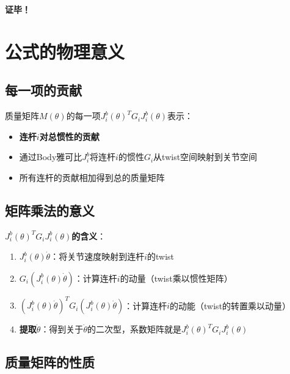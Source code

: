 \documentclass[12pt,a4paper]{article}
\begin{document}
\textbf{证毕！}

\section{公式的物理意义}

\subsection{每一项的贡献}

质量矩阵$M(\theta)$的每一项$J_i^b(\theta)^T G_i J_i^b(\theta)$表示：

\begin{itemize}
\item \textbf{连杆$i$对总惯性的贡献}
\item 通过Body雅可比$J_i^b$将连杆$i$的惯性$G_i$从twist空间映射到关节空间
\item 所有连杆的贡献相加得到总的质量矩阵
\end{itemize}

\subsection{矩阵乘法的意义}

\textbf{$J_i^b(\theta)^T G_i J_i^b(\theta)$的含义}：

\begin{enumerate}
\item \textbf{$J_i^b(\theta) \dot{\theta}$}：将关节速度映射到连杆$i$的twist
\item \textbf{$G_i (J_i^b(\theta) \dot{\theta})$}：计算连杆$i$的动量（twist乘以惯性矩阵）
\item \textbf{$(J_i^b(\theta) \dot{\theta})^T G_i (J_i^b(\theta) \dot{\theta})$}：计算连杆$i$的动能（twist的转置乘以动量）
\item \textbf{提取$\dot{\theta}$}：得到关于$\dot{\theta}$的二次型，系数矩阵就是$J_i^b(\theta)^T G_i J_i^b(\theta)$
\end{enumerate}

\subsection{质量矩阵的性质}
\end{document}
